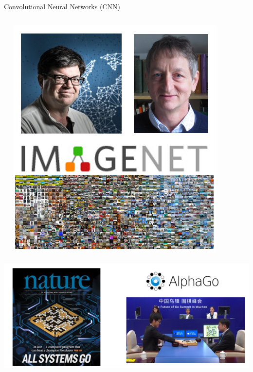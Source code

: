 \documentclass{beamer}
\begin{document}
\begin{CJK*}{UTF8}{gbsn}
\begin{frame}{Convolutional Neural Networks (CNN)}
\begin{columns}
\begin{column}{0.4\textwidth}
\centering  
\includegraphics[width=\textwidth, height= 0.4\textheight]{figures/ImageNet}  \\
\centering  
\includegraphics[width=\textwidth, height= 0.4\textheight]{figures/Alphago}  
\end{column}

\end{columns}

\end{frame}



\end{CJK*}
\end{document}
